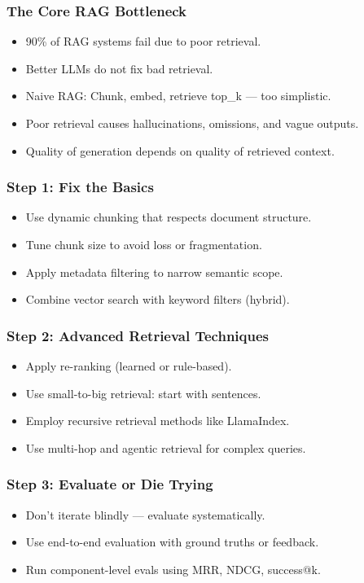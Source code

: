 \begin{frame}[fragile]\frametitle{The Core RAG Bottleneck}
      \begin{itemize}
        \item 90\% of RAG systems fail due to poor retrieval.
        \item Better LLMs do not fix bad retrieval.
        \item Naive RAG: Chunk, embed, retrieve top\_k — too simplistic.
        \item Poor retrieval causes hallucinations, omissions, and vague outputs.
        \item Quality of generation depends on quality of retrieved context.
      \end{itemize}
\end{frame}

\begin{frame}[fragile]\frametitle{Step 1: Fix the Basics}
      \begin{itemize}
        \item Use dynamic chunking that respects document structure.
        \item Tune chunk size to avoid loss or fragmentation.
        \item Apply metadata filtering to narrow semantic scope.
        \item Combine vector search with keyword filters (hybrid).
      \end{itemize}
\end{frame}

\begin{frame}[fragile]\frametitle{Step 2: Advanced Retrieval Techniques}
      \begin{itemize}
        \item Apply re-ranking (learned or rule-based).
        \item Use small-to-big retrieval: start with sentences.
        \item Employ recursive retrieval methods like LlamaIndex.
        \item Use multi-hop and agentic retrieval for complex queries.
      \end{itemize}
\end{frame}

\begin{frame}[fragile]\frametitle{Step 3: Evaluate or Die Trying}
      \begin{itemize}
        \item Don’t iterate blindly — evaluate systematically.
        \item Use end-to-end evaluation with ground truths or feedback.
        \item Run component-level evals using MRR, NDCG, success@k.
      \end{itemize}
\end{frame}

